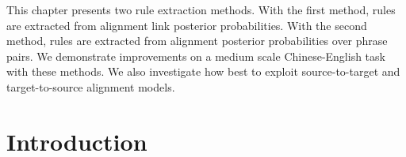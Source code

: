 This chapter presents two rule extraction methods. With the first method, rules
are extracted from alignment link posterior probabilities. With the second
method, rules are extracted from alignment posterior probabilities
over phrase pairs. We
demonstrate improvements on a medium scale Chinese-English task with these
methods. We also investigate how best to exploit source-to-target and
target-to-source alignment models.



\section{Introduction}
\label{sec:extractionFromPosteriorsIntro}

